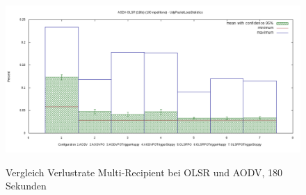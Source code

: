 \begin{figure}
  \centering
  \includegraphics[scale=0.45]{bilder/c3.png} \\
  \caption{Vergleich Verlustrate Multi-Recipient bei OLSR und AODV, 180 Sekunden}
  \label{image:omnet:olsr:comp3}
\end{figure}